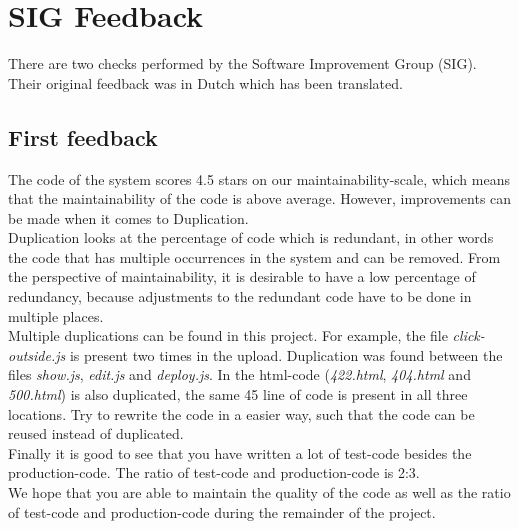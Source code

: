 \chapter{SIG Feedback}
There are two checks performed by the Software Improvement Group (SIG). Their original feedback was in Dutch which has been translated.
\section{First feedback}
The code of the system scores 4.5 stars on our maintainability-scale, which means that the maintainability of the code is above average. However, improvements can be made when it comes to Duplication.\\[0.5cm]
Duplication looks at the percentage of code which is redundant, in other words the code that has multiple occurrences in the system and can be removed. From the perspective of maintainability, it is desirable to have a low percentage of redundancy, because adjustments to the redundant code have to be done in multiple places.\\[0.5cm]
Multiple duplications can be found in this project. For example, the file \textit{click-outside.js} is present two times in the upload. Duplication was found between the files \textit{show.js}, \textit{edit.js} and \textit{deploy.js}. In the html-code (\textit{422.html}, \textit{404.html} and \textit{500.html}) is also duplicated, the same 45 line of code is present in all three locations. Try to rewrite the code in a easier way, such that the code can be reused instead of duplicated.\\[0.5cm]
Finally it is good to see that you have written a lot of test-code besides the production-code. The ratio of test-code and production-code is 2:3.\\[0.5cm]
We hope that you are able to maintain the quality of the code as well as the ratio of test-code and production-code during the remainder of the project.

